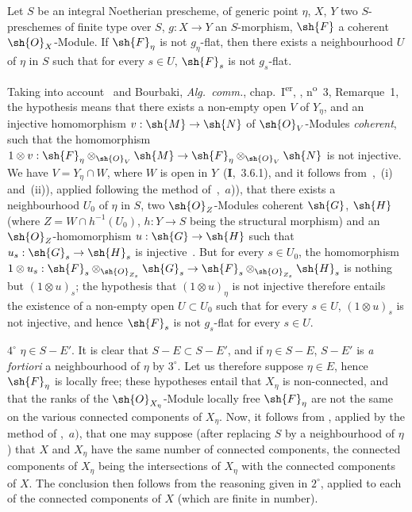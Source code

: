 \begin{lemma}[9.4.7.1]
\label{IV.9.4.7.1}
Let $S$ be an integral Noetherian prescheme, of generic point $\eta$, $X$, $Y$ two $S$-preschemes of finite type over $S$, $g:X\to Y$ an $S$-morphism, $\sh{F}$ a coherent $\sh{O}_X$-Module.
If $\sh{F}_\eta$ is not $g_\eta$-flat, then there exists a neighbourhood $U$ of $\eta$ in $S$ such that for every $s\in U$, $\sh{F}_s$ is not $g_s$-flat.
\end{lemma}

Taking into account~ and Bourbaki, \emph{Alg.\ comm.}, chap.~I\textsuperscript{er}, , n\textsuperscript{o}~3, Remarque~1, the hypothesis means that there exists a non-empty open $V$ of $Y_\eta$, and an injective homomorphism $v:\sh{M}\to\sh{N}$ of $\sh{O}_V$-Modules \emph{coherent}, such that the homomorphism $1\otimes v:\sh{F}_\eta\otimes_{\sh{O}_V}\sh{M}\to\sh{F}_\eta\otimes_{\sh{O}_V}\sh{N}$ is not injective.
We have $V=Y_\eta\cap W$, where $W$ is open in $Y$~(\textbf{I},~3.6.1), and it follows from~,~(i) and~(ii)), applied following the method of~,~$a$)), that there exists a neighbourhood $U_0$ of $\eta$ in $S$, two $\sh{O}_Z$-Modules
coherent $\sh{G}$, $\sh{H}$ (where $Z=W\cap h^{-1}(U_0)$, $h:Y\to S$ being the structural morphism) and an $\sh{O}_Z$-homomorphism $u:\sh{G}\to\sh{H}$ such that $u_s:\sh{G}_s\to\sh{H}_s$ is injective~.
But for every $s\in U_0$, the homomorphism $1\otimes u_s:\sh{F}_s\otimes_{\sh{O}_{Z_s}}\sh{G}_s\to\sh{F}_s\otimes_{\sh{O}_{Z_s}}\sh{H}_s$ is nothing but $(1\otimes u)_s$; the hypothesis that $(1\otimes u)_\eta$ is not injective therefore entails~ the existence of a non-empty open $U\subset U_0$ such that for every $s\in U$, $(1\otimes u)_s$ is not injective, and hence $\sh{F}_s$ is not $g_s$-flat for every $s\in U$.

$4^\circ$ $\eta\in S-E'$.
It is clear that $S-E\subset S-E'$, and if $\eta\in S-E$, $S-E'$ is \emph{a fortiori} a neighbourhood of $\eta$ by $3^\circ$.
Let us therefore suppose $\eta\in E$, hence $\sh{F}_\eta$ is locally free; these hypotheses entail that $X_\eta$ is non-connected, and that the ranks of the $\sh{O}_{X_\eta}$-Module locally free $\sh{F}_\eta$ are not the same on the various connected components of $X_\eta$.
Now, it follows from , applied by the method of ,~$a)$, that one may suppose (after replacing $S$ by a neighbourhood of $\eta$) that $X$ and $X_\eta$ have the same number of connected components, the connected components of $X_\eta$ being the intersections of $X_\eta$ with the connected components of $X$.
The conclusion then follows from the reasoning given in $2^\circ$, applied to each of the connected components of $X$ (which are finite in number).

